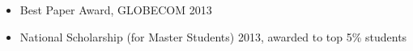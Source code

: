 \documentclass[paper=a4,fontsize=11pt]{scrartcl} %
\begin{document}
\begin{itemize}
\item Best Paper Award, GLOBECOM 2013
\item National Scholarship (for Master Students) 2013, awarded to top 5\% students
\end{itemize}





\end{document}
